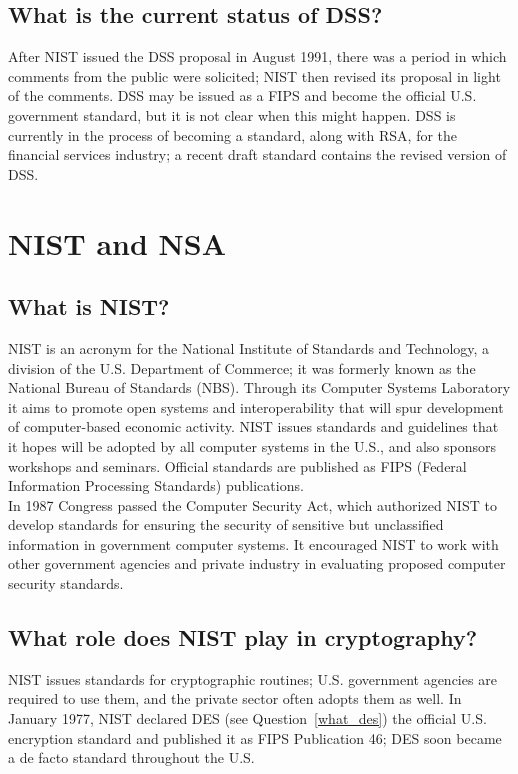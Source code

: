 \subsection{What is the current status of DSS?}

After NIST issued the DSS proposal in August 1991, there was a period
in which comments from the public were solicited; NIST then revised its
proposal in light of the comments. DSS may be issued as a FIPS and
become the official U.S. government standard, but it is not clear when
this might happen. DSS is currently in the process of becoming a
standard, along with RSA, for the financial services industry; a recent
draft standard contains the revised version of DSS.


\section{NIST and NSA}

\subsection{What is NIST?}
\label{what_nist}

NIST is an acronym for the National Institute of Standards and
Technology, a division of the U.S. Department of Commerce; it was
formerly known as the National Bureau of Standards (NBS). Through its
Computer Systems Laboratory it aims to promote open systems and
interoperability that will spur development of computer-based economic
activity. NIST issues standards and guidelines that it hopes will be
adopted by all computer systems in the U.S., and also sponsors
workshops and seminars. Official standards are published as FIPS
(Federal Information Processing Standards) publications.\\

In 1987 Congress passed the Computer Security Act, which authorized
NIST to develop standards for ensuring the security of sensitive but
unclassified information in government computer systems. It encouraged
NIST to work with other government agencies and private industry in
evaluating proposed computer security standards.

\subsection{What role does NIST play in cryptography?}

NIST issues standards for cryptographic routines; U.S. government agencies
are required to use them, and the private sector often adopts them as well.
In January 1977, NIST declared DES (see Question~\ref{what_des}) the
official U.S. encryption standard and published it as FIPS Publication 46;
DES soon became a de facto standard throughout the U.S.\\

